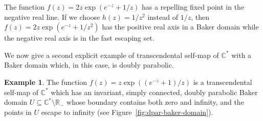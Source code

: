 \documentclass[a4paper, 12pt, reqno]{amsart}
\numberwithin{equation}{section}
\theoremstyle{plain}
\theoremstyle{definition}
\newtheorem{ex}[thm]{Example}
\theoremstyle{remark}
\newcommand{\C}{{\mathbb{C}}}
\newcommand{\R}{{\mathbb{R}}}
\begin{document}
The function $f(z)=2 z\exp(e^{-z}+1/z)$ has a repelling fixed point in the negative real line. If we choose $h(z)=1/z^2$ instead of $1/z$, then $f(z)=2 z\exp(e^{-z}+1/z^2)$ has the positive real axis in a Baker domain while the negative real axis is in the fast escaping set.




We now give a second explicit example of transcendental self-map of $\C^*$ with a Baker domain which, in this case, is doubly parabolic.

\begin{ex}
The function $f(z)=z\exp\left((e^{-z}+1)/z\right)$ is a transcendental self-map of $\C^*$ which has an invariant, simply connected, doubly parabolic Baker domain $U\subseteq \C^*\setminus \R_-$ whose boundary contains both zero and infinity, and the points in $U$ escape to infinity (see Figure~\ref{fig:dpar-baker-domain}). \vspace*{-10pt}
\label{ex:dpar-baker-domain}
\end{ex}
\end{document}
